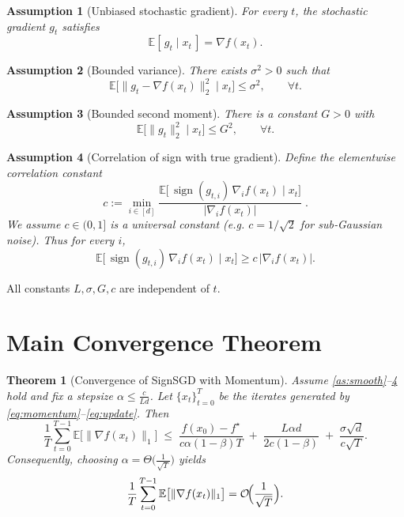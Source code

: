 \documentclass{article}
\newtheorem{theorem}{Theorem}[section]
\newtheorem{assumption}{Assumption}[section]
\begin{document}
\begin{assumption}[Unbiased stochastic gradient]\label{as:unbiased}
For every $t$, the stochastic gradient $g_{t}$ satisfies
\[
\mathbb{E}[\,g_{t}\mid x_{t}\,]=\nabla f(x_{t}) .
\]
\end{assumption}

\begin{assumption}[Bounded variance]\label{as:variance}
There exists $\sigma^{2}>0$ such that
\[
\mathbb{E}\bigl[\|g_{t}-\nabla f(x_{t})\|_{2}^{2}\mid x_{t}\bigr]\le\sigma^{2},
\qquad\forall t .
\]
\end{assumption}

\begin{assumption}[Bounded second moment]\label{as:second}
There is a constant $G>0$ with
\[
\mathbb{E}\bigl[\|g_{t}\|_{2}^{2}\mid x_{t}\bigr]\le G^{2},
\qquad\forall t .
\]
\end{assumption}

\begin{assumption}[Correlation of sign with true gradient]\label{as:signcorr}
Define the elementwise correlation constant
\[
c:=\min_{i\in[d]}\frac{\mathbb{E}\bigl[\,\operatorname{sign}(g_{t,i})\,\nabla_{i}f(x_{t})\mid x_{t}\bigr]}
{\bigl|\nabla_{i}f(x_{t})\bigr|}\; .
\]
We assume $c\in(0,1]$ is a universal constant (e.g. $c=1/\sqrt{2}$ for sub‑Gaussian noise).  
Thus for every $i$,
\[
\mathbb{E}\bigl[\,\operatorname{sign}(g_{t,i})\,\nabla_{i}f(x_{t})\mid x_{t}\bigr]\ge c\,|\nabla_{i}f(x_{t})| .
\tag{A5}
\]
\end{assumption}

All constants $L,\sigma,G,c$ are independent of $t$.

\section*{Main Convergence Theorem}
\begin{theorem}[Convergence of SignSGD with Momentum]\label{thm:main}
Assume \ref{as:smooth}–\ref{as:signcorr} hold and fix a stepsize $\alpha\le\frac{c}{L d}$.
Let $\{x_{t}\}_{t=0}^{T}$ be the iterates generated by \eqref{eq:momentum}–\eqref{eq:update}.
Then
\[
\frac{1}{T}\sum_{t=0}^{T-1}\mathbb{E}\bigl[\|\nabla f(x_{t})\|_{1}\bigr]
\;\le\;
\frac{f(x_{0})-f^{\star}}{c\alpha(1-\beta)T}
\;+\;
\frac{L\alpha d}{2c(1-\beta)}
\;+\;
\frac{\sigma\sqrt{d}}{c\sqrt{T}} .
\tag{1}
\]
Consequently, choosing $\alpha =\Theta\!\bigl(\frac{1}{\sqrt{T}}\bigr)$ yields
\[
\frac{1}{T}\sum_{t=0}^{T-1}\mathbb{E}\bigl[\|\nabla f(x_{t})\|_{1}\bigr]=
\mathcal{O}\!\Bigl(\frac{1}{\sqrt{T}}\Bigr).
\]
\end{theorem}
\end{document}
